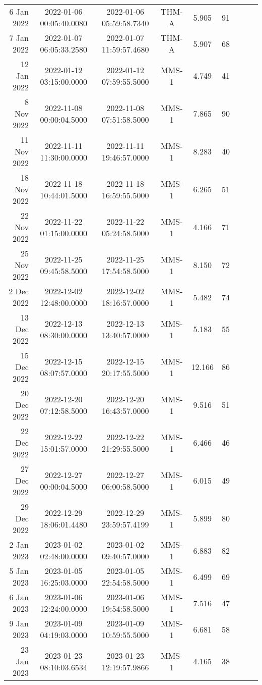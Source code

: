 \begin{longtable}{r|cccccccc}
6 Jan 2022     &  2022-01-06 00:05:40.0080 &  2022-01-06 05:59:58.7340 &  THM-A &    5.905 &     91 \\
7 Jan 2022     &  2022-01-07 06:05:33.2580 &  2022-01-07 11:59:57.4680 &  THM-A &    5.907 &     68 \\
12 Jan 2022    &  2022-01-12 03:15:00.0000 &  2022-01-12 07:59:55.5000 &  MMS-1 &    4.749 &     41 \\
8 Nov 2022     &  2022-11-08 00:00:04.5000 &  2022-11-08 07:51:58.5000 &  MMS-1 &    7.865 &     90 \\
11 Nov 2022    &  2022-11-11 11:30:00.0000 &  2022-11-11 19:46:57.0000 &  MMS-1 &    8.283 &     40 \\
18 Nov 2022    &  2022-11-18 10:44:01.5000 &  2022-11-18 16:59:55.5000 &  MMS-1 &    6.265 &     51 \\
22 Nov 2022    &  2022-11-22 01:15:00.0000 &  2022-11-22 05:24:58.5000 &  MMS-1 &    4.166 &     71 \\
25 Nov 2022    &  2022-11-25 09:45:58.5000 &  2022-11-25 17:54:58.5000 &  MMS-1 &    8.150 &     72 \\
2 Dec 2022     &  2022-12-02 12:48:00.0000 &  2022-12-02 18:16:57.0000 &  MMS-1 &    5.482 &     74 \\
13 Dec 2022    &  2022-12-13 08:30:00.0000 &  2022-12-13 13:40:57.0000 &  MMS-1 &    5.183 &     55 \\
15 Dec 2022    &  2022-12-15 08:07:57.0000 &  2022-12-15 20:17:55.5000 &  MMS-1 &   12.166 &     86 \\
20 Dec 2022    &  2022-12-20 07:12:58.5000 &  2022-12-20 16:43:57.0000 &  MMS-1 &    9.516 &     51 \\
22 Dec 2022    &  2022-12-22 15:01:57.0000 &  2022-12-22 21:29:55.5000 &  MMS-1 &    6.466 &     46 \\
27 Dec 2022    &  2022-12-27 00:00:04.5000 &  2022-12-27 06:00:58.5000 &  MMS-1 &    6.015 &     49 \\
29 Dec 2022    &  2022-12-29 18:06:01.4480 &  2022-12-29 23:59:57.4199 &  MMS-1 &    5.899 &     80 \\
2 Jan 2023     &  2023-01-02 02:48:00.0000 &  2023-01-02 09:40:57.0000 &  MMS-1 &    6.883 &     82 \\
5 Jan 2023     &  2023-01-05 16:25:03.0000 &  2023-01-05 22:54:58.5000 &  MMS-1 &    6.499 &     69 \\
6 Jan 2023     &  2023-01-06 12:24:00.0000 &  2023-01-06 19:54:58.5000 &  MMS-1 &    7.516 &     47 \\
9 Jan 2023     &  2023-01-09 04:19:03.0000 &  2023-01-09 10:59:55.5000 &  MMS-1 &    6.681 &     58 \\
23 Jan 2023    &  2023-01-23 08:10:03.6534 &  2023-01-23 12:19:57.9866 &  MMS-1 &    4.165 &     38 \\
\hline
\end{longtable}

